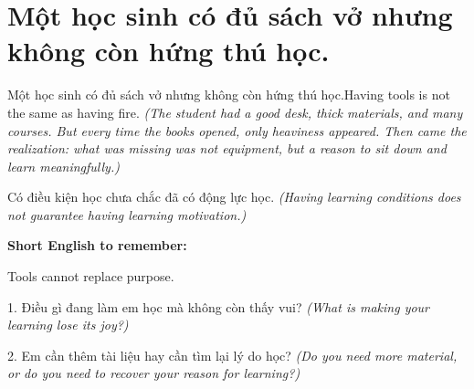 \section{Một học sinh có đủ sách vở nhưng không còn hứng thú học.}
\begin{truyen}{Một học sinh có đủ sách vở nhưng không còn hứng thú học.}{Having tools is not the same as having fire.}
\textit{(The student had a good desk, thick materials, and many courses. But every time the books opened, only heaviness appeared. Then came the realization: what was missing was not equipment, but a reason to sit down and learn meaningfully.)}
\end{truyen}
\begin{baihoc}
Có điều kiện học chưa chắc đã có động lực học.
\textit{(Having learning conditions does not guarantee having learning motivation.)}
\end{baihoc}
\begin{ghinhoanh}
\textbf{Short English to remember:}

Tools cannot replace purpose.
\end{ghinhoanh}
\begin{tuhocnhanh}
1. Điều gì đang làm em học mà không còn thấy vui? \textit{(What is making your learning lose its joy?)}

2. Em cần thêm tài liệu hay cần tìm lại lý do học? \textit{(Do you need more material, or do you need to recover your reason for learning?)}
\end{tuhocnhanh}
\ngancach

